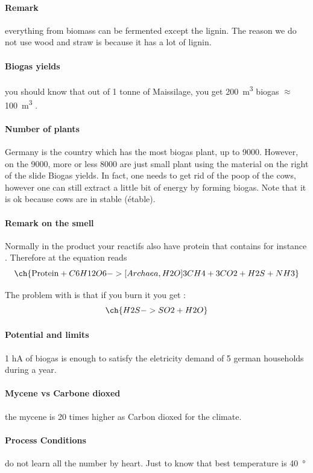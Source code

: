 \documentclass[10pt,a4paper]{article}
\begin{document}
\paragraph{Remark}everything from biomass can be fermented except the lignin. The reason we do not use wood and straw is because it has a lot of lignin.

\paragraph{Biogas yields} you should know that out of 1 tonne of Maissilage, you get \SI{200}{\meter\cubed} biogas $\approx$ \SI{100}{\meter\cubed} .

\paragraph{Number of plants}Germany is the country which has the most biogas plant, up to 9000. However, on the 9000, more or less 8000 are just small plant using the material on the right of the slide Biogas yields. In fact, one needs to get rid of the poop of the cows, however one can still extract a little bit of energy by forming biogas. Note that it is ok because cows are in stable (étable).

\paragraph{Remark on the smell} Normally in the product your reactifs also have protein that contains for instance . Therefore at the equation reads 
$$\ch{\text{Protein} + C6H12O6 ->[Archaea, H2O] 3 CH4 + 3 CO2 + H2S + NH3}$$

The problem with  is that if you burn it you get :
$$\ch{H2S -> SO2 + H2O}$$

\paragraph{Potential and limits} 1 hA of biogas is enough to satisfy the eletricity demand of 5 german households during a year.

\paragraph{Mycene vs Carbone dioxed} the mycene is 20 times higher as Carbon dioxed for the climate.

\paragraph{Process Conditions} do not learn all the number by heart. Just to know that best temperature is \SI{40}{\degree}
\end{document}
